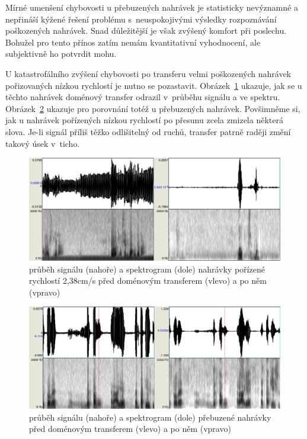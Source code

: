 Mírné umenšení chybovosti u přebuzených nahrávek je statisticky nevýznamné a
nepřináší kýžené řešení problému s~neuspokojivými výsledky rozpoznávání
poškozených nahrávek. Snad důležitější je však zvýšený komfort při
poslechu. Bohužel pro tento přínos zatím nemám kvantitativní vyhodnocení, ale
subjektivně ho potvrdit mohu.

U katastrofálního zvýšení chybovosti po transferu velmi poškozených nahrávek
pořizovaných nízkou rychlostí je nutno se pozastavit.
Obrázek~\ref{fig:gan:plzen} ukazuje, jak se u těchto nahrávek doménový transfer
odrazil v~průběhu signálu a ve spektru. Obrázek~\ref{fig:gan:overdrive} ukazuje
pro porovnání totéž u přebuzených nahrávek. Povšimněme si, jak u nahrávek
pořízených nízkou rychlostí po přesunu zcela zmizela některá slova. Je-li signál
příliš těžko odlišitelný od ruchů, transfer patrně raději změní takový úsek
v~ticho.

\begin{figure}[htpb]
\includegraphics[scale=0.4]{rc/gan-plzen.eps}
\caption{průběh signálu (nahoře) a spektrogram (dole) nahrávky pořízené
rychlostí 2,38cm/s před doménovým transferem (vlevo) a po něm (vpravo)}
\label{fig:gan:plzen}
\end{figure}

\begin{figure}[htpb]
\includegraphics[scale=0.4]{rc/gan-overdrive.eps}
\caption{průběh signálu (nahoře) a spektrogram (dole) přebuzené nahrávky
před doménovým transferem (vlevo) a po něm (vpravo)}
\label{fig:gan:overdrive}
\end{figure}
